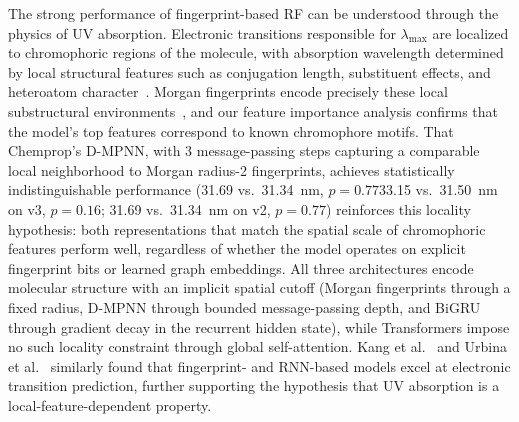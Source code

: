 \documentclass[journal=jcisd8,manuscript=article]{achemso}
\newcommand{\added}[1]{{\color{addedblue}#1}}
\newcommand{\removed}[1]{{\color{removedred}#1}}
\begin{document}
The strong performance of fingerprint-based RF can be understood through the physics of UV absorption.
Electronic transitions responsible for $\lambda_{\max}$ are localized to chromophoric regions of the molecule, with absorption wavelength determined by local structural features such as conjugation length, substituent effects, and heteroatom character~\cite{flemingMolecular2010, reichardt2011solvents}.
Morgan fingerprints encode precisely these local substructural environments~\cite{rogers2010extended}, and our feature importance analysis confirms that the model's top features correspond to known chromophore motifs.
That Chemprop's D-MPNN, with 3 message-passing steps capturing a comparable local neighborhood to Morgan radius-2 fingerprints, achieves statistically indistinguishable performance (\removed{31.69 vs.\ 31.34~nm, $p = 0.77$}\added{33.15 vs.\ 31.50~nm on v3, $p = 0.16$; 31.69 vs.\ 31.34~nm on v2, $p = 0.77$}) reinforces this locality hypothesis: both representations that match the spatial scale of chromophoric features perform well, regardless of whether the model operates on explicit fingerprint bits or learned graph embeddings.
All three architectures encode molecular structure with an implicit spatial cutoff (Morgan fingerprints through a fixed radius, D-MPNN through bounded message-passing depth, and BiGRU through gradient decay in the recurrent hidden state), while Transformers impose no such locality constraint through global self-attention.
Kang et al.~\cite{kang2020prediction} and Urbina et al.~\cite{beard2022uvadvisor} similarly found that fingerprint- and RNN-based models excel at electronic transition prediction, further supporting the hypothesis that UV absorption is a local-feature-dependent property.
\end{document}
